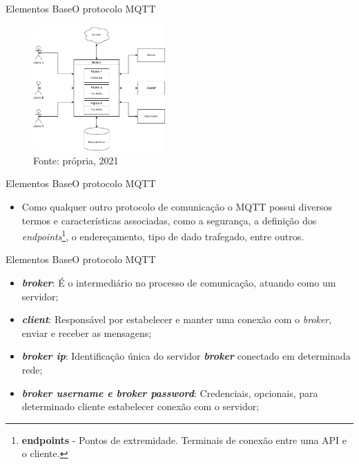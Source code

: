 \begin{frame}{Elementos Base}{O protocolo MQTT}

    \begin{figure}[H]
        \centering
        \caption{Diagrama básico MQTT}
        \includegraphics[width=0.45\textwidth]{figuras/mqtt.drawio.png}
        \caption*{\tiny{Fonte: própria, 2021}}
        \label{fig:mqtt_diagram}
    \end{figure}

\end{frame}

\begin{frame}{Elementos Base}{O protocolo MQTT}
    \begin{itemize}
        \item Como qualquer outro protocolo de comunicação o MQTT possui diversos termos e características associadas, como a segurança, a definição dos \textit{endpoints}\footnote{\textbf{endpoints} - Pontos de extremidade. Terminais de conexão entre uma API e o cliente.}, o endereçamento, tipo de dado trafegado, entre outros.
    \end{itemize}

\end{frame}

\begin{frame}{Elementos Base}{O protocolo MQTT}
    \begin{itemize}
        \item \textbf{\textit{broker}}: É o intermediário no processo de comunicação, atuando como um servidor;
        \item \textbf{\textit{client}}: Responsável por estabelecer e manter uma conexão com o \textit{broker}, enviar e receber as mensagens;
        \item \textit{\textbf{broker ip}}: Identificação única do servidor \textit{\textbf{broker}} conectado em determinada rede;
        \item \textbf{\textit{broker username e broker password}}: Credenciais, opcionais, para determinado cliente estabelecer conexão com o servidor; 
    \end{itemize}

\end{frame}

